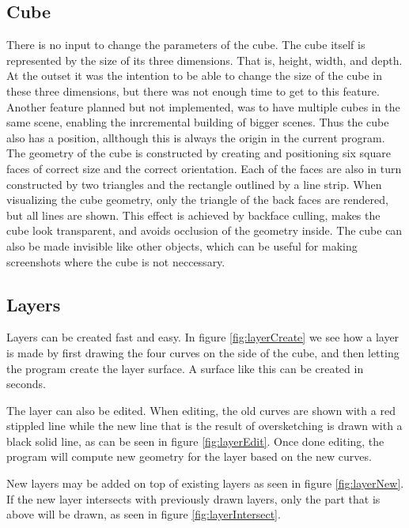 \documentclass[a4paper,12pt]{report}
\begin{document}
\subsection{Cube}
There is no input to change the parameters of the cube. The cube itself is represented by the size of its three dimensions. That is, height, width, and depth. At the outset it was the intention to be able to change the size of the cube in these three dimensions, but there was not enough time to get to this feature. Another feature planned but not implemented, was to have multiple cubes in the same scene, enabling the inrcremental building of bigger scenes. Thus the cube also has a position, allthough this is always the origin in the current program. The geometry of the cube is constructed by creating and positioning six square faces of correct size and the correct orientation. Each of the faces are also in turn constructed by two triangles and the rectangle outlined by a line strip. When visualizing the cube geometry, only the triangle of the back faces are rendered, but all lines are shown. This effect is achieved by backface culling, makes the cube look transparent, and avoids occlusion of the geometry inside. The cube can also be made invisible like other objects, which can be useful for making screenshots where the cube is not neccessary.

\subsection{Layers}
Layers can be created fast and easy. In figure \ref{fig:layerCreate} we see how a layer is made by first drawing the four curves on the side of the cube, and then letting the program create the layer surface. A surface like this can be created in seconds.

The layer can also be edited. When editing, the old curves are shown with a red stippled line while the new line that is the result of oversketching is drawn with a black solid line, as can be seen in figure \ref{fig:layerEdit}. Once done editing, the program will compute new geometry for the layer based on the new curves.

New layers may be added on top of existing layers as seen in figure \ref{fig:layerNew}. If the new layer intersects with previously drawn layers, only the part that is above will be drawn, as seen in figure \ref{fig:layerIntersect}.
\end{document}

